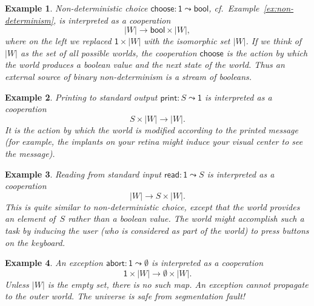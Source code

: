 \documentclass{amsart}
\newcommand{\opdecl}[3]{#1 : #2 \leadsto #3} %
\newcommand{\one}{\mathsf{1}} %
\newcommand{\bool}{\mathsf{bool}} %
\newcommand{\kode}[1]{\mathsf{#1}}
\newtheorem{example}{Example}[section]
\begin{document}
\begin{example}
  Non-deterministic choice $\opdecl{\kode{choose}}{\one}{\bool}$, cf.\
  Example~\ref{ex:non-determinism}, is interpreted as a cooperation
  \begin{equation*}
    |W| \to {\bool} \times |W|,
  \end{equation*}
  where on the left we replaced $\one \times |W|$ with the isomorphic set $|W|$.
  If we think of $|W|$ as the set of all possible worlds, the cooperation
  $\kode{choose}$ is the action by which the world produces a boolean value and
  the next state of the world. Thus an external source of binary non-determinism
  is a stream of booleans.
\end{example}

\begin{example}
  Printing to standard output $\opdecl{\kode{print}}{S}{\one}$ is interpreted as
  a cooperation
  \begin{equation*}
    S \times |W| \to |W|.
  \end{equation*}
  It is the action by which the world is modified according to the printed
  message (for example, the implants on your retina might induce your visual
  center to see the message).
\end{example}

\begin{example}
  Reading from standard input $\opdecl{\kode{read}}{\one}{S}$ is interpreted as
  a cooperation
  \begin{equation*}
    |W| \to S \times |W|.
  \end{equation*}
  This is quite similar to non-deterministic choice, except that the world
  provides an element of~$S$ rather than a boolean value. The world might
  accomplish such a task by inducing the user (who is considered as part of the
  world) to press buttons on the keyboard.
\end{example}

\begin{example}
  An exception $\opdecl{\kode{abort}}{\one}{\emptyset}$ is interpreted as a
  cooperation
  \begin{equation*}
    \one \times |W| \to \emptyset \times |W|.
  \end{equation*}
  Unless $|W|$ is the empty set, there is no such map. An exception cannot
  propagate to the outer world. The universe is safe from segmentation fault!
\end{example}
\end{document}
